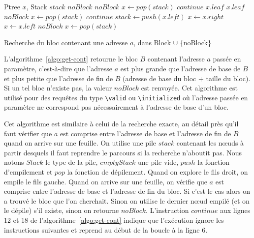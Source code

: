 \begin{algorithm}[h!]
\begin{algorithmic}[1]
\Statex Ptree $x$, Stack $stack$
  \Return $noBlock$
\Else
          \Return $noBlock$
        \Else
          \State $x \gets \mathit{pop(stack)}$
          \State $\mathit{continue}$
        \EndIf
        \Return $\mathit{x.leaf}$
        \Return $\mathit{x.leaf}$
        \Return $noBlock$
      \Else
        \State $x \gets \mathit{pop(stack)}$
        \State $\mathit{continue}$
      \EndIf
    \EndIf
      \State $\mathit{stack} \gets \mathit{push(x.left)}$
      \State $x \gets \mathit{x.right}$
      \State $x \gets \mathit{x.left}$
      \Return $noBlock$
    \Else
      \State $x \gets \mathit{pop(stack)}$
    \EndIf
  \EndWhile
\EndIf
\EndFunction
\end{algorithmic}
\caption{Recherche du bloc contenant une adresse $a$, dans Block $\cup$
  \{noBlock\}
  \label{algo:get-cont}}
\end{algorithm}

L'algorithme~\ref{algo:get-cont} retourne le bloc $B$ contenant
l'adresse $a$ passée en paramètre, c'est-à-dire que l'adresse $a$ est plus
grande que l'adresse de base de $B$ et plus petite que l'adresse de fin de $B$
(adresse de base du bloc + taille du bloc).
Si un tel bloc n'existe pas, la valeur $noBlock$ est renvoyée.
Cet algorithme est utilisé pour des requêtes du type \lstinline{\valid} ou
\lstinline{\initialized} où l'adresse passée en paramètre ne correspond pas
nécessairement à l'adresse de base d'un bloc.

Cet algorithme est similaire à celui de la recherche exacte, au détail près
qu'il faut vérifier que $a$ est comprise entre l'adresse de base et l'adresse
de fin de $B$ quand on arrive sur une feuille.
On utilise une pile $stack$ contenant les n\oe{}uds à partir desquels il faut
reprendre le parcours si la recherche n'aboutit pas.
Nous notons $Stack$ le type de la pile, $emptyStack$ une pile vide, $push$ la
fonction d'empilement et $pop$ la fonction de dépilement.
Quand on explore le fils droit, on empile le fils gauche.
Quand on arrive sur une feuille, on vérifie que $a$ est comprise entre l'adresse
de base et l'adresse de fin du bloc.
Si c'est le cas alors on a trouvé le bloc que l'on cherchait.
Sinon on utilise le dernier n\oe{}ud empilé (et on le dépile) s'il existe,
sinon on retourne $noBlock$.
L'instruction $continue$ aux lignes 12 et 18 de l'algorithme~\ref{algo:get-cont}
indique que l'exécution ignore les instructions suivantes et reprend au début de
la boucle à la ligne 6.


